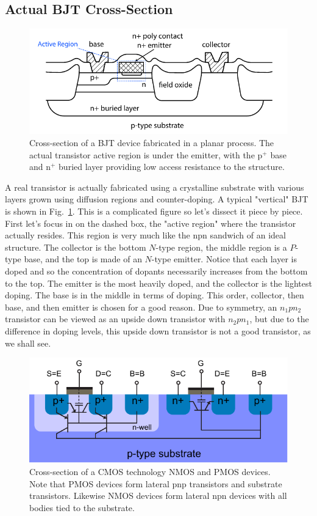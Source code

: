 \subsection{Actual BJT Cross-Section}
\begin{figure}[tb]
\centering
\includegraphics[width=.75\columnwidth]{slide3_bjtcross}
\caption{Cross-section of a BJT device fabricated in a planar process.  The actual transistor active region is under the emitter, with the p$^+$ base and n$^+$ buried layer providing low access resistance to the structure.}
\label{fig:slide3_bjtcross}
\end{figure}
A real transistor is actually fabricated using a crystalline substrate with various layers grown using diffusion regions and counter-doping.  A typical "vertical" BJT is shown in Fig.~\ref{fig:slide3_bjtcross}.  This is a complicated figure so let's dissect it piece by piece.   First let's focus in on the dashed box, the "active region" where the transistor actually resides.  This region is very much like the npn sandwich of an ideal structure.  The collector is the bottom $N$-type region, the middle region is a $P$-type base, and the top is made of an $N$-type emitter.  Notice that each layer is doped and so the concentration of dopants necessarily increases from the bottom to the top. The emitter is the most heavily doped, and the collector is the lightest doping. The base is in the middle in terms of doping.  This order, collector, then base, and then emitter is chosen for a good reason.  Due to symmetry, an $n_1 p n_2$ transistor can be viewed as an upside down transistor with $n_2 p n_1$, but due to the difference in doping levels, this upside down transistor is not a good transistor, as we shall see.  
\begin{figure}[tb]
\centering
\includegraphics[width=.75\columnwidth]{mos_bjt}
\caption{Cross-section of a CMOS technology NMOS and PMOS devices.  Note that PMOS devices form lateral pnp transistors and substrate transistors.  Likewise NMOS devices form lateral npn devices with all bodies tied to the substrate.}
\label{fig:mos_bjt}
\end{figure}
